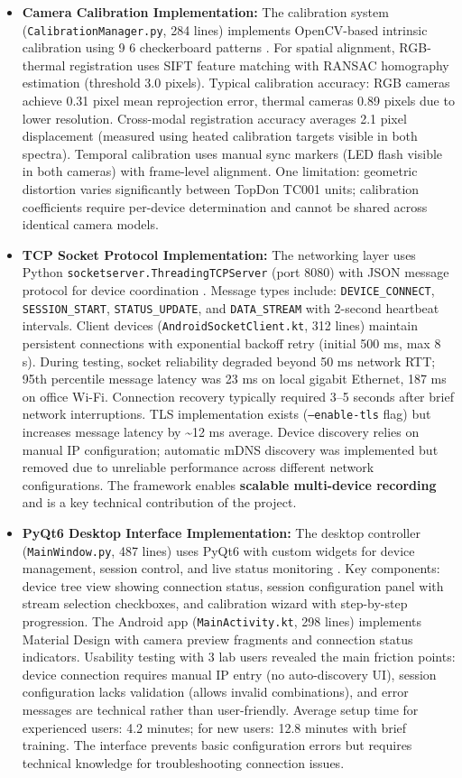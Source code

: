 \begin{itemize}
    \item \textbf{Camera Calibration Implementation:} The calibration system (\texttt{CalibrationManager.py}, 284 lines) implements OpenCV-based intrinsic calibration using 9\,\texttimes\,6 checkerboard patterns \cite{ref22}. For spatial alignment, RGB-thermal registration uses SIFT feature matching with RANSAC homography estimation (threshold 3.0 pixels). Typical calibration accuracy: RGB cameras achieve 0.31 pixel mean reprojection error, thermal cameras 0.89 pixels due to lower resolution. Cross-modal registration accuracy averages 2.1 pixel displacement (measured using heated calibration targets visible in both spectra). Temporal calibration uses manual sync markers (LED flash visible in both cameras) with frame-level alignment. One limitation: geometric distortion varies significantly between TopDon TC001 units; calibration coefficients require per-device determination and cannot be shared across identical camera models.
    \item \textbf{TCP Socket Protocol Implementation:} The networking layer uses Python \texttt{socketserver.ThreadingTCPServer} (port 8080) with JSON message protocol for device coordination \cite{ref21}. Message types include: \texttt{DEVICE\_CONNECT}, \texttt{SESSION\_START}, \texttt{STATUS\_UPDATE}, and \texttt{DATA\_STREAM} with 2-second heartbeat intervals. Client devices (\texttt{AndroidSocketClient.kt}, 312 lines) maintain persistent connections with exponential backoff retry (initial 500 ms, max 8 s). During testing, socket reliability degraded beyond 50 ms network RTT; 95th percentile message latency was 23 ms on local gigabit Ethernet, 187 ms on office Wi-Fi. Connection recovery typically required 3--5 seconds after brief network interruptions. TLS implementation exists (\texttt{--enable-tls} flag) but increases message latency by \textasciitilde{}12 ms average. Device discovery relies on manual IP configuration; automatic mDNS discovery was implemented but removed due to unreliable performance across different network configurations. The framework enables \textbf{scalable multi-device recording} and is a key technical contribution of the project.
    \item \textbf{PyQt6 Desktop Interface Implementation:} The desktop controller (\texttt{MainWindow.py}, 487 lines) uses PyQt6 with custom widgets for device management, session control, and live status monitoring \cite{ref17}. Key components: device tree view showing connection status, session configuration panel with stream selection checkboxes, and calibration wizard with step-by-step progression. The Android app (\texttt{MainActivity.kt}, 298 lines) implements Material Design with camera preview fragments and connection status indicators. Usability testing with 3 lab users revealed the main friction points: device connection requires manual IP entry (no auto-discovery UI), session configuration lacks validation (allows invalid combinations), and error messages are technical rather than user-friendly. Average setup time for experienced users: 4.2 minutes; for new users: 12.8 minutes with brief training. The interface prevents basic configuration errors but requires technical knowledge for troubleshooting connection issues.
\end{itemize}


